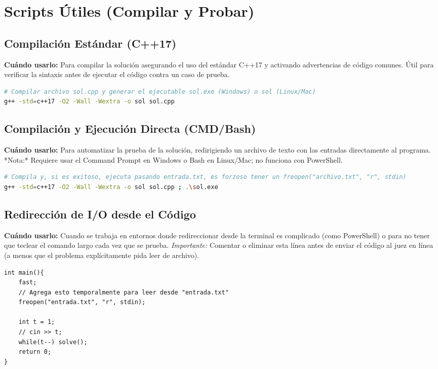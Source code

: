 \documentclass[10pt,a4paper]{article}
\begin{document}
\section{Scripts Útiles (Compilar y Probar)}
\begin{multicols}{2}

\subsection{Compilación Estándar (C++17)}
\textbf{Cuándo usarlo:} Para compilar la solución asegurando el uso del estándar C++17 y activando advertencias de código comunes. Útil para verificar la sintaxis antes de ejecutar el código contra un caso de prueba.

\begin{lstlisting}[language=bash]
# Compilar archivo sol.cpp y generar el ejecutable sol.exe (Windows) o sol (Linux/Mac)
g++ -std=c++17 -O2 -Wall -Wextra -o sol sol.cpp
\end{lstlisting}

\subsection{Compilación y Ejecución Directa (CMD/Bash)}
\textbf{Cuándo usarlo:} Para automatizar la prueba de la solución, redirigiendo un archivo de texto con las entradas directamente al programa. *Nota:* Requiere usar el Command Prompt en Windows o Bash en Linux/Mac; no funciona con PowerShell.

\begin{lstlisting}[language=bash]
# Compila y, si es exitoso, ejecuta pasando entrada.txt, es forzoso tener un freopen("archivo.txt", "r", stdin)
g++ -std=c++17 -O2 -Wall -Wextra -o sol sol.cpp ; .\sol.exe
\end{lstlisting}

\subsection{Redirección de I/O desde el Código}
\textbf{Cuándo usarlo:} Cuando se trabaja en entornos donde redireccionar desde la terminal es complicado (como PowerShell) o para no tener que teclear el comando largo cada vez que se prueba.
\textit{Importante:} Comentar o eliminar esta línea antes de enviar el código al juez en línea (a menos que el problema explícitamente pida leer de archivo).

\begin{lstlisting}
int main(){
    fast;
    // Agrega esto temporalmente para leer desde "entrada.txt"
    freopen("entrada.txt", "r", stdin); 
    
    int t = 1;
    // cin >> t;
    while(t--) solve();
    return 0;
}
\end{lstlisting}

\end{multicols}
\end{document}
